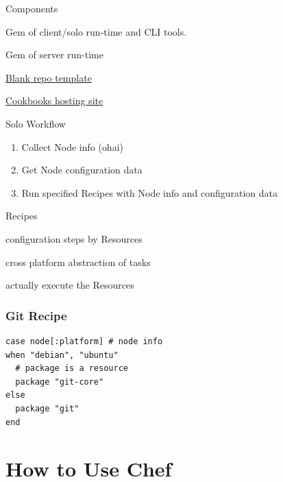 \documentclass[xetex,mathserif,serif,12pt]{beamer}
\begin{document}
\begin{frame}{Components}
  \begin{description}[<+->]
  \item[chef] Gem of client/solo run-time and CLI tools.
  \item[chef-server] Gem of server run-time
  \item[Chef Repo] \href{https://github.com/opscode/chef-repo}{Blank repo template}
  \item[Community] \href{http://community.opscode.com/}{Cookbooks hosting site}
  \end{description}
\end{frame}

\begin{frame}{Solo Workflow}
  \begin{enumerate}[<+->]
  \item Collect \alert{Node} info (\alert{ohai})
  \item Get \alert{Node} configuration data
  \item Run specified \alert{Recipes} with \alert{Node} info and configuration data
  \end{enumerate}
\end{frame}

\begin{frame}{Recipes}
  \begin{description}[<+->]
  \item[Recipes] configuration steps by \alert{Resources}
  \item[Resources] cross platform abstraction of tasks
  \item[Providers] actually execute the Resources
  \end{description}
\end{frame}

\begin{frame}[fragile]
  \frametitle{Git Recipe}
  \begin{beamer@nomargin}
    \begin{lstlisting}
case node[:platform] # node info
when "debian", "ubuntu"
  # package is a resource
  package "git-core"
else 
  package "git"
end
    \end{lstlisting}  
  \end{beamer@nomargin}
\end{frame}

\section{How to Use Chef}
\label{sec:how-use}
\end{document}

